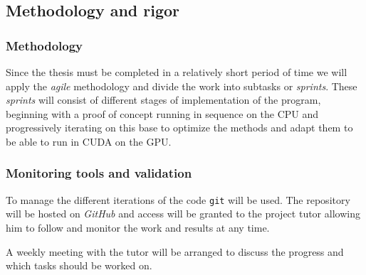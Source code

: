 \subsection{Methodology and rigor}

\subsubsection{Methodology}

Since the thesis must be completed in a relatively short period of time we will
apply the \emph{agile} methodology and divide the work into subtasks or
\emph{sprints}. These \emph{sprints} will consist of different stages of
implementation of the program, beginning with a proof of concept running in
sequence on the CPU and progressively iterating on this base to optimize the
methods and adapt them to be able to run in CUDA on the GPU.

\subsubsection{Monitoring tools and validation}

To manage the different iterations of the code \texttt{git} will be used. The
repository will be hosted on \emph{GitHub} and access will be granted to the
project tutor allowing him to follow and monitor the work and results at any time.

A weekly meeting with the tutor will be arranged to discuss the progress and
which tasks should be worked on.
